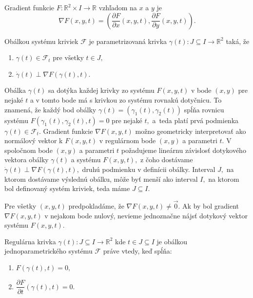 \begin{definition}
Gradient funkcie $F \colon \mathbb{R}^2 \times I \rightarrow \mathbb{R}$ vzhľadom na $x$ a $y$ je
$$\nabla F(x, y, t) = \left(\frac{\partial F}{\partial x}(x, y, t), \frac{\partial F}{\partial y}(x, y, t) \right).$$ 
\end{definition}

\begin{definition}
\label{definicia}
Obálkou systému kriviek $ \mathcal{F} $ je parametrizovaná krivka $\gamma(t) \colon J \subseteq I \rightarrow \mathbb{R}^{2}$ taká, že 
\begin{enumerate}
\item $\gamma(t) \in \mathcal{F}_{t} \text{ pre všetky } t \in J,$
\item $\dot{\gamma}(t) \perp \nabla F \left( \gamma(t), t \right).$
\end{enumerate}
\end{definition}

Obálka $\gamma(t)$ sa dotýka každej krivky zo systému $F(x,y,t)$ v bode $(x, y)$  pre nejaké $t$ a v tomto bode má s krivkou zo systému rovnakú dotyčnicu. To znamená, že každý bod obálky ${\gamma}(t) = (\gamma_{1}(t),\gamma_{2}(t))$ spĺňa rovnicu systému $F(\gamma_{1}(t),\gamma_{2}(t),t)=0$ pre nejaké $t,$ a~teda platí prvá podmienka $\gamma(t) \in \mathcal{F}_{t}$. Gradient funkcie $ \nabla F(x,y,t)$ možno geometricky interpretovať ako normálový vektor k $F(x,y,t)$ v regulárnom bode $(x,y)$ a parametri $t$. V spoločnom bode $(x,y)$ a parametri $t$ požadujeme lineárnu závislosť dotykového vektora obálky $\gamma(t)$ a systému $F(x,y,t), $ z čoho dostávame $\dot{\gamma}(t) \perp \nabla F \left( \gamma(t), t \right), $ druhú podmienku v definícii obálky. Interval $J,$ na ktorom dostávame výslednú obálku, môže byť menší ako interval $I,$ na ktorom bol definovaný systém kriviek, teda máme $J \subseteq I.$

Pre všetky $(x, y, t)$ predpokladáme, že  $\nabla F(x,y,t) \neq \vec{0}. $  Ak by bol gradient $\nabla F(x,y,t) $ v nejakom bode nulový, nevieme jednoznačne nájsť dotykový vektor systému $F(x, y, t).$ 

\begin{theorem}
Regulárna krivka $\gamma(t) \colon J \subseteq I \rightarrow \mathbb{R}^{2}$ kde $t \in J  \subseteq I$ je obálkou jednoparametrického systému $\mathcal{F}$ práve vtedy, keď spĺňa:
\begin{enumerate}
\item $F(\gamma(t), t) = 0, $ 
\item $\dfrac{\partial F}{\partial t}(\gamma(t), t) = 0.$
\end{enumerate}
\end{theorem}

